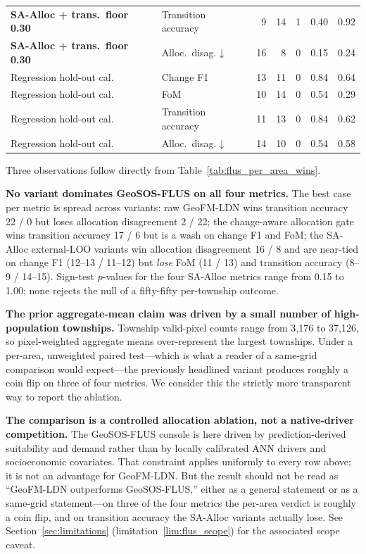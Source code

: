 \documentclass{article}
\begin{document}
\begin{table}[htbp]
\begin{tabular*}{\textwidth}{@{\extracolsep{\fill}}llrrrrr@{}}
\textbf{SA-Alloc + trans.\ floor 0.30} & Transition accuracy     & 9  & 14 & 1 & 0.40 & 0.92 \\
\textbf{SA-Alloc + trans.\ floor 0.30} & Alloc.\ disag.$\downarrow$ & 16 & 8  & 0 & 0.15 & 0.24 \\
\midrule
Regression hold-out cal.\ & Change F1               & 13 & 11 & 0 & 0.84 & 0.64 \\
Regression hold-out cal.\ & FoM                     & 10 & 14 & 0 & 0.54 & 0.29 \\
Regression hold-out cal.\ & Transition accuracy     & 11 & 13 & 0 & 0.84 & 0.62 \\
Regression hold-out cal.\ & Alloc.\ disag.$\downarrow$ & 14 & 10 & 0 & 0.54 & 0.58 \\
\bottomrule
\end{tabular*}
\end{table}

Three observations follow directly from Table~\ref{tab:flus_per_area_wins}.

\textbf{No variant dominates GeoSOS-FLUS on all four metrics.} The best case per metric is spread across variants: raw GeoFM-LDN wins transition accuracy 22 / 0 but loses allocation disagreement 2 / 22; the change-aware allocation gate wins transition accuracy 17 / 6 but is a wash on change F1 and FoM; the SA-Alloc external-LOO variants win allocation disagreement 16 / 8 and are near-tied on change F1 (12--13 / 11--12) but \emph{lose} FoM (11 / 13) and transition accuracy (8--9 / 14--15). Sign-test $p$-values for the four SA-Alloc metrics range from 0.15 to 1.00; none rejects the null of a fifty-fifty per-township outcome.

\textbf{The prior aggregate-mean claim was driven by a small number of high-population townships.} Township valid-pixel counts range from 3{,}176 to 37{,}126, so pixel-weighted aggregate means over-represent the largest townships. Under a per-area, unweighted paired test---which is what a reader of a same-grid comparison would expect---the previously headlined variant produces roughly a coin flip on three of four metrics. We consider this the strictly more transparent way to report the ablation.

\textbf{The comparison is a controlled allocation ablation, not a native-driver competition.} The GeoSOS-FLUS console is here driven by prediction-derived suitability and demand rather than by locally calibrated ANN drivers and socioeconomic covariates. That constraint applies uniformly to every row above; it is not an advantage for GeoFM-LDN. But the result should not be read as ``GeoFM-LDN outperforms GeoSOS-FLUS,'' either as a general statement or as a same-grid statement---on three of the four metrics the per-area verdict is roughly a coin flip, and on transition accuracy the SA-Alloc variants actually lose. See Section~\ref{sec:limitations} (limitation~\ref{lim:flus_scope}) for the associated scope caveat.
\end{document}
